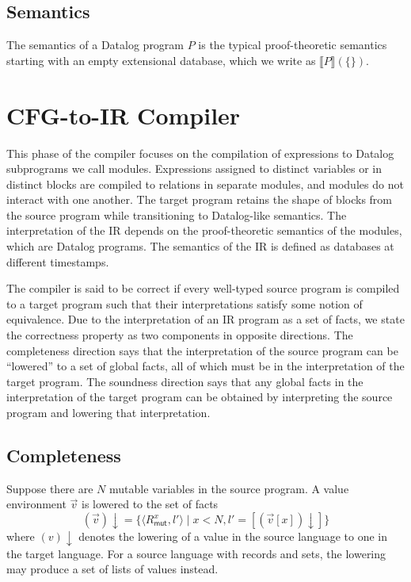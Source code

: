 \documentclass[11pt]{article}
\newcommand{\mut}{\textsf{mut}}
\begin{document}
\subsection{Semantics}
The semantics of a Datalog program $P$ is the typical proof-theoretic semantics starting with an empty extensional database, which we write as $\llbracket P \rrbracket(\{\})$.

\section{CFG-to-IR Compiler}
This phase of the compiler focuses on the compilation of expressions to Datalog subprograms we call modules.
Expressions assigned to distinct variables or in distinct blocks are compiled to relations in separate modules, and modules do not interact with one another.
The target program retains the shape of blocks from the source program while transitioning to Datalog-like semantics.
The interpretation of the IR depends on the proof-theoretic semantics of the modules, which are Datalog programs.
The semantics of the IR is defined as databases at different timestamps.

The compiler is said to be correct if every well-typed source program is compiled to a target program such that their interpretations satisfy some notion of equivalence.
Due to the interpretation of an IR program as a set of facts, we state the correctness property as two components in opposite directions.
The completeness direction says that the interpretation of the source program can be ``lowered'' to a set of global facts, all of which must be in the interpretation of the target program.
The soundness direction says that any global facts in the interpretation of the target program can be obtained by interpreting the source program and lowering that interpretation.

\subsection{Completeness}
Suppose there are $N$ mutable variables in the source program.
A value environment $\vec{v}$ is lowered to the set of facts
\[
(\vec{v})\downarrow =
\{ \langle R_{\mut{}}^x, l' \rangle \mid x < N, l' = [(\vec{v}[x])\downarrow] \}
\]
where $(v)\downarrow$ denotes the lowering of a value in the source language to one in the target language.
For a source language with records and sets, the lowering may produce a set of lists of values instead.
\end{document}
